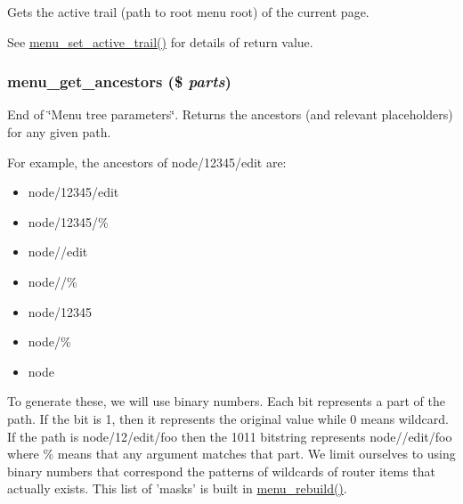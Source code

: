 Gets the active trail (path to root menu root) of the current page.

See \hyperlink{group__menu_g9328a9a4f297d8bb095d924e75a8abd7}{menu\_\-set\_\-active\_\-trail()} for details of return value. \hypertarget{group__menu_g24ddfa75da5f03482a2df2c9c8d1f711}{
\subsubsection[{menu\_\-get\_\-ancestors}]{\setlength{\rightskip}{0pt plus 5cm}menu\_\-get\_\-ancestors (\$ {\em parts})}}
\label{group__menu_g24ddfa75da5f03482a2df2c9c8d1f711}


End of \char`\"{}Menu tree parameters\char`\"{}. Returns the ancestors (and relevant placeholders) for any given path.

For example, the ancestors of node/12345/edit are:\begin{itemize}
\item node/12345/edit\item node/12345/\%\item node//edit\item node//\%\item node/12345\item node/\%\item node\end{itemize}


To generate these, we will use binary numbers. Each bit represents a part of the path. If the bit is 1, then it represents the original value while 0 means wildcard. If the path is node/12/edit/foo then the 1011 bitstring represents node//edit/foo where \% means that any argument matches that part. We limit ourselves to using binary numbers that correspond the patterns of wildcards of router items that actually exists. This list of 'masks' is built in \hyperlink{group__menu_gf36dcb9d5491ef5e7d2cf22c1f5c69f4}{menu\_\-rebuild()}.

